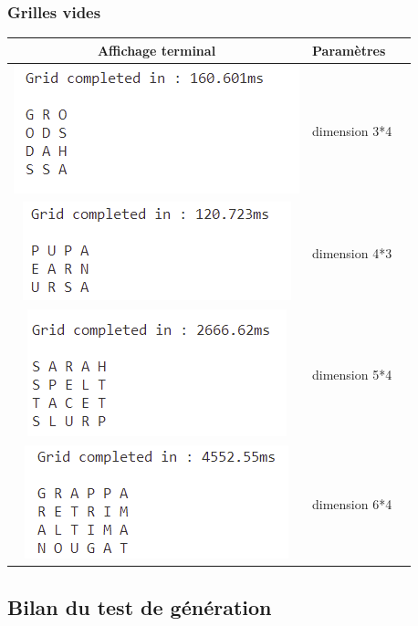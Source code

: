 \documentclass [ 11 pt ] {article}
\begin{document}
        \subsubsection{Grilles vides}
        \begin{center}
    \begin{tabular}{ | c |  m{5cm} | m{5cm} | }
    \hline
    Affichage terminal & Paramètres \\ 
    \hline
      \includegraphics[]{3_4.png}
    & dimension 3*4 \\
    \hline
      \includegraphics[]{4_3.png}
    & dimension 4*3 \\
    \hline
      \includegraphics[]{5_4.png}
    & dimension 5*4 \\
    \hline
      \includegraphics[]{6_4.png}
    & dimension 6*4 \\
    \hline
    \end{tabular}
    \end{center}
        
    \subsection{Bilan du test de génération}
    
\end{document}
